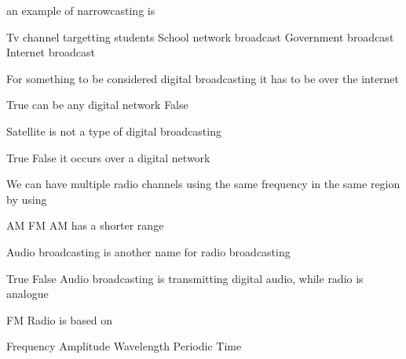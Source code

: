 

\begin{question}
  an example of narrowcasting is
  \begin{choice}
    \incorrect Tv channel targetting students
    \correct School network broadcast
    \incorrect Government broadcast
    \incorrect Internet broadcast
  \end{choice}

\end{question}

\begin{question}
  For something to be considered digital broadcasting it has to be over the internet
  \begin{choice}
    \incorrect True \feedback can be any digital network
    \correct False
  \end{choice}

\end{question}

\begin{question}
  Satellite is not a type of digital broadcasting
  \begin{choice}
    \incorrect True
    \correct False \feedback it occurs over a digital network
  \end{choice}

\end{question}

\begin{question}
  We can have multiple radio channels using the same frequency in the same region by using
  \begin{choice}
    \correct AM
    \incorrect FM \feedback AM has a shorter range
  \end{choice}
\end{question}

\begin{question}
  Audio broadcasting is another name for radio broadcasting
  \begin{choice}
    \incorrect True
    \correct False
    \feedback Audio broadcasting is transmitting digital audio, while radio is analogue
  \end{choice}
\end{question}

\begin{question}
  FM Radio is based on
  \begin{choice}
    \correct Frequency
    \incorrect Amplitude
    \incorrect Wavelength
    \incorrect Periodic Time
  \end{choice}
\end{question}

